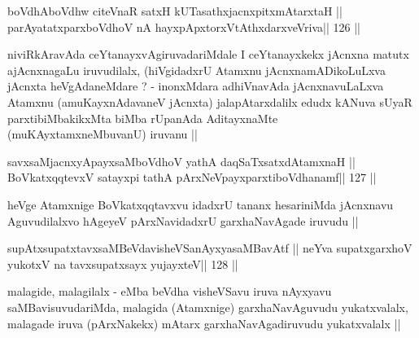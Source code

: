 \begin{shl}
boVdhAboVdhw citeVnaR satxH kUTasathxjacnxpitxmAtarxtaH ||
parAyatatxparxboVdhoV nA hayxpApxtorxVtAthxdarxveVriva\hfill || 126 ||
\end{shl}

\begin{artha}
niviRkAravAda ceYtanayxvAgiruvadariMdale I ceYtanayxkekx jAcnxna matutx 
ajAcnxnagaLu iruvudilalx, (hiVgidadxrU Atamxnu jAcnxnamADikoLuLxva 
jAcnxta heVgAdaneMdare ? - inonxMdara adhiVnavAda jAcnxnavuLaLxva Atamxnu (amuKayxnAdavaneV jAcnxta) jalapAtarxdalilx edudx kANuva sUyaR parxtibiMbakikxMta biMba rUpanAda AditayxnaMte (muKAyxtamxneMbuvanU) iruvanu ||
\end{artha}

\begin{shl}
savxsaMjacnxyA\s payxsaMboVdhoV yathA daqSaTxsatxdAtamxnaH ||
BoVkatxqqtevxV satayxpi tathA pArxNeV\s payxparxtiboVdhanamf\hfill || 127 ||
\end{shl}

\begin{artha}
heVge Atamxnige BoVkatxqqtavxvu idadxrU tananx hesariniMda jAcnxnavu 
Aguvudilalxvo hAgeyeV pArxNavidadxrU garxhaNavAgade iruvudu ||
\end{artha} 

\begin{shl}
supAtxsupatxtavxsaMBeVdavisheVSanAyxyasaMBavAtf ||
neYva supatxgarxhoV yukotxV na tavxsupatxsayx yujayxteV\hfill || 128 ||
\end{shl}

\begin{artha}
malagide, malagilalx - eMba beVdha visheVSavu iruva nAyxyavu saMBavisuvudariMda, malagida (Atamxnige) garxhaNavAguvudu yukatxvalalx, malagade iruva (pArxNakekx) mAtarx garxhaNavAgadiruvudu yukatxvalalx ||
\end{artha}

